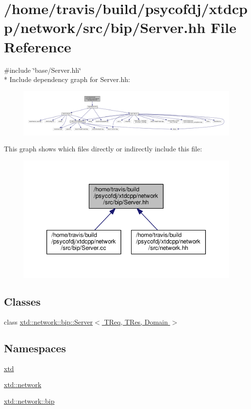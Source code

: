 \hypertarget{bip_2Server_8hh}{\section{/home/travis/build/psycofdj/xtdcpp/network/src/bip/\-Server.hh File Reference}
\label{bip_2Server_8hh}
}
{\ttfamily \#include \char`\"{}base/\-Server.\-hh\char`\"{}}\\*
Include dependency graph for Server.\-hh\-:
\nopagebreak
\begin{figure}[H]
\begin{center}
\leavevmode
\includegraphics[width=350pt]{bip_2Server_8hh__incl}
\end{center}
\end{figure}
This graph shows which files directly or indirectly include this file\-:
\nopagebreak
\begin{figure}[H]
\begin{center}
\leavevmode
\includegraphics[width=350pt]{bip_2Server_8hh__dep__incl}
\end{center}
\end{figure}
\subsection*{Classes}
\begin{DoxyCompactItemize}
\item 
class \hyperlink{classxtd_1_1network_1_1bip_1_1Server}{xtd\-::network\-::bip\-::\-Server$<$ T\-Req, T\-Res, Domain $>$}
\end{DoxyCompactItemize}
\subsection*{Namespaces}
\begin{DoxyCompactItemize}
\item 
\hyperlink{namespacextd}{xtd}
\item 
\hyperlink{namespacextd_1_1network}{xtd\-::network}
\item 
\hyperlink{namespacextd_1_1network_1_1bip}{xtd\-::network\-::bip}
\end{DoxyCompactItemize}
